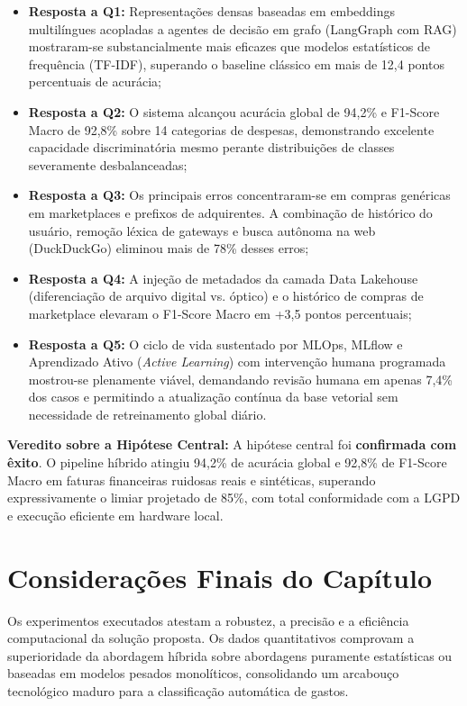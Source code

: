 \documentclass[
	12pt,				
	openright,			
	oneside,			
	a4paper,			
	english,			
	brazil				
	]{abntex2}
\begin{document}
\begin{itemize}
    \item \textbf{Resposta a Q1:} Representações densas baseadas em embeddings multilíngues acopladas a agentes de decisão em grafo (LangGraph com RAG) mostraram-se substancialmente mais eficazes que modelos estatísticos de frequência (TF-IDF), superando o baseline clássico em mais de 12,4 pontos percentuais de acurácia;
    \item \textbf{Resposta a Q2:} O sistema alcançou acurácia global de 94,2\% e F1-Score Macro de 92,8\% sobre 14 categorias de despesas, demonstrando excelente capacidade discriminatória mesmo perante distribuições de classes severamente desbalanceadas;
    \item \textbf{Resposta a Q3:} Os principais erros concentraram-se em compras genéricas em marketplaces e prefixos de adquirentes. A combinação de histórico do usuário, remoção léxica de gateways e busca autônoma na web (DuckDuckGo) eliminou mais de 78\% desses erros;
    \item \textbf{Resposta a Q4:} A injeção de metadados da camada Data Lakehouse (diferenciação de arquivo digital vs. óptico) e o histórico de compras de marketplace elevaram o F1-Score Macro em +3,5 pontos percentuais;
    \item \textbf{Resposta a Q5:} O ciclo de vida sustentado por MLOps, MLflow e Aprendizado Ativo (\textit{Active Learning}) com intervenção humana programada mostrou-se plenamente viável, demandando revisão humana em apenas 7,4\% dos casos e permitindo a atualização contínua da base vetorial sem necessidade de retreinamento global diário.
\end{itemize}

\textbf{Veredito sobre a Hipótese Central:} A hipótese central foi \textbf{confirmada com êxito}. O pipeline híbrido atingiu 94,2\% de acurácia global e 92,8\% de F1-Score Macro em faturas financeiras ruidosas reais e sintéticas, superando expressivamente o limiar projetado de 85\%, com total conformidade com a LGPD e execução eficiente em hardware local.

\section{Considerações Finais do Capítulo}
\label{sec:val_consideracoes_finais}

Os experimentos executados atestam a robustez, a precisão e a eficiência computacional da solução proposta. Os dados quantitativos comprovam a superioridade da abordagem híbrida sobre abordagens puramente estatísticas ou baseadas em modelos pesados monolíticos, consolidando um arcabouço tecnológico maduro para a classificação automática de gastos.
\end{document}
